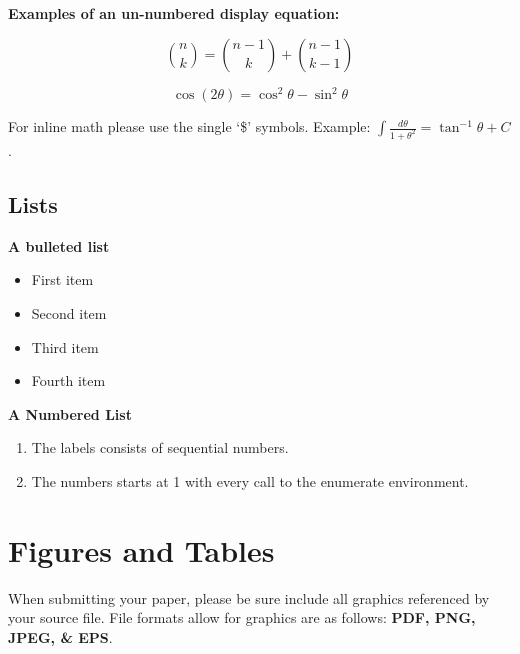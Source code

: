 \documentclass{csmagazine}
\begin{document}
\begin{flushleft}
\textbf{Examples of an un-numbered display equation:}

\[\binom{n}{k} =\binom{n-1}{k} + \binom{n-1}{k-1}\]


\begin{equation*}
\cos (2\theta) = \cos^2 \theta - \sin^2 \theta
\end{equation*}


For inline math please use the single `\$' symbols. Example: $\int\frac{d\theta} {1+\theta^2}=\tan^{-1} \theta+C$.

\subsection{Lists}

\textbf{A bulleted list}

\begin{itemize}
	\itemsep0em 
	\item First item
	\item Second item
	\item Third item
	\item Fourth item
\end{itemize}

\textbf{A Numbered List}

\begin{enumerate}
	\item The labels consists of sequential numbers.
	\item The numbers starts at 1 with every call to the enumerate environment.
\end{enumerate}




\section{Figures and Tables}

When submitting your paper, please be sure include all graphics referenced by your source file. File formats allow for graphics are as follows: \textbf{PDF, PNG, JPEG, \& EPS}.


\end{flushleft}
\end{document}
